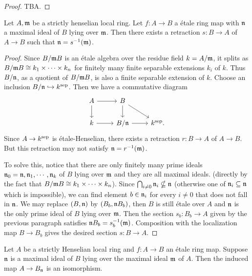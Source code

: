 \begin{proof}
    TBA.
\end{proof}

\begin{proposition}
    \label{thm:strictly-henselian-good-retraction}
    Let \(A, {\mathfrak{m}}\) be a strictly henselian local ring. Let \(f : A \to B\) a \'etale ring map with \({\mathfrak{n}}\) a maximal ideal of \(B\) lying over \({\mathfrak{m}}\). Then there exists a retraction \(s : B \to A\) of \(A \to B\) such that \({\mathfrak{n}} = s^{-1}({\mathfrak{m}})\).
\end{proposition}

\begin{proof}
  Since \(B/{\mathfrak{m}} B\) is an étale algebra over the residue field \(k = A/{\mathfrak{m}}\), it splits as \(B/{\mathfrak{m}} B \cong k_1 \times \cdots \times k_n\) for finitely many finite separable extensions \(k_i\) of \(k\). Thus \(B/{\mathfrak{n}}\), as a quotient of \(B/{\mathfrak{m}} B\), is also a finite separable extension of \(k\). Choose an inclusion \(B/{\mathfrak{n}} \hookrightarrow k^{\textnormal{sep}}\). Then we have a commutative diagram
  \[
  \begin{tikzcd}
    A \arrow{r} \arrow{d} & B \arrow{d}\arrow{rd} & \\
    k \arrow{r} & B/\n \arrow{r} & k^{\sep}.
  \end{tikzcd}
  \]
  Since \(A \to k^{\textnormal{sep}}\) is étale-Henselian, there exists a retraction \(r : B \to A\) of \(A \to B\). But this retraction may not satisfy \({\mathfrak{n}} = r^{-1}({\mathfrak{m}})\). 
  
  To solve this, notice that there are only finitely many prime ideals \({\mathfrak{n}}_0 = {\mathfrak{n}}, {\mathfrak{n}}_1, \cdots, {\mathfrak{n}}_k\) of \(B\) lying over \({\mathfrak{m}}\) and they are all maximal ideals. (directly by the fact that \(B/{\mathfrak{m}} B \cong k_1 \times \cdots \times k_n\)). Since \(\bigcap_{i \ne 0} {\mathfrak{n}}_i \nsubseteq {\mathfrak{n}}\) (otherwise one of \({\mathfrak{n}}_i \subseteq {\mathfrak{n}}\) which is impossible), we can find element \(b \in {\mathfrak{n}}_i\) for every \(i \ne 0\) that does not fall in ${\mathfrak{n}}$. We may replace \((B, {\mathfrak{n}})\) by \((B_b, {\mathfrak{n}} B_b)\), then \(B\) is still étale over \(A\) and \({\mathfrak{n}}\) is the only prime ideal of \(B\) lying over \({\mathfrak{m}}\). Then the section \(s_b : B_b \to A\) given by the previous paragraph satisfies \({\mathfrak{n}} B_b = s_b^{-1}({\mathfrak{m}})\). Composition with the localization map \(B \to B_b\) gives the desired section \(s : B \to A\).
\end{proof}

\begin{proposition}
    \label{thm:etale-over-strictly-henselian-localization-isom}
    Let \(A\) be a strictly Henselian local ring and \(f : A \to B\) an étale ring map. Suppose \({\mathfrak{n}}\) is a maximal ideal of \(B\) lying over the maximal ideal \({\mathfrak{m}}\) of \(A\). Then the induced map \(A \to B_{\mathfrak{n}}\) is an isomorphism.
\end{proposition}

